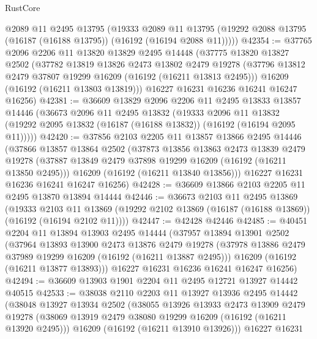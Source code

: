 \begin{lexlean}{RustCore}
\begin{coremodule}
      @2089
      @11
      @2495
      @13795
      (@19333
        @2089
        @11
        @13795
        (@19292 @2088 @13795 (@16187 (@16188 @13795)) (@16192 (@16194 @2088 @11)))))
@42354 := @37765
    @2096
    @2206
    @11
    @13820
    @13829
    @2495
    @14448
    (@37775
      @13820
      @13827
      @2502
      (@37782
        @13819
        @13826
        @2473
        @13802
        @2479
        @19278
        (@37796 @13812 @2479 @37807 @19299 @16209 (@16192 (@16211 @13813 @2495)))
        @16209
        (@16192 (@16211 @13803 @13819)))
      @16227
      @16231
      @16236
      @16241
      @16247
      @16256)
@42381 := @36609
    @13829
    @2096
    @2206
    @11
    @2495
    @13833
    @13857
    @14446
    (@36673
      @2096
      @11
      @2495
      @13832
      (@19333
        @2096
        @11
        @13832
        (@19292 @2095 @13832 (@16187 (@16188 @13832)) (@16192 (@16194 @2095 @11)))))
@42420 := @37856
    @2103
    @2205
    @11
    @13857
    @13866
    @2495
    @14446
    (@37866
      @13857
      @13864
      @2502
      (@37873
        @13856
        @13863
        @2473
        @13839
        @2479
        @19278
        (@37887 @13849 @2479 @37898 @19299 @16209 (@16192 (@16211 @13850 @2495)))
        @16209
        (@16192 (@16211 @13840 @13856)))
      @16227
      @16231
      @16236
      @16241
      @16247
      @16256)
@42428 := @36609 @13866 @2103 @2205 @11 @2495 @13870 @13894 @14444
@42446 := @36673
    @2103
    @11
    @2495
    @13869
    (@19333
      @2103
      @11
      @13869
      (@19292 @2102 @13869 (@16187 (@16188 @13869)) (@16192 (@16194 @2102 @11))))
@42447 := @42428 @42446
@42485 := @40451
    @2204
    @11
    @13894
    @13903
    @2495
    @14444
    (@37957
      @13894
      @13901
      @2502
      (@37964
        @13893
        @13900
        @2473
        @13876
        @2479
        @19278
        (@37978 @13886 @2479 @37989 @19299 @16209 (@16192 (@16211 @13887 @2495)))
        @16209
        (@16192 (@16211 @13877 @13893)))
      @16227
      @16231
      @16236
      @16241
      @16247
      @16256)
@42494 := @36609 @13903 @1901 @2204 @11 @2495 @12721 @13927 @14442 @40515
@42533 := @38038
    @2110
    @2203
    @11
    @13927
    @13936
    @2495
    @14442
    (@38048
      @13927
      @13934
      @2502
      (@38055
        @13926
        @13933
        @2473
        @13909
        @2479
        @19278
        (@38069 @13919 @2479 @38080 @19299 @16209 (@16192 (@16211 @13920 @2495)))
        @16209
        (@16192 (@16211 @13910 @13926)))
      @16227
      @16231

\end{coremodule}
\end{lexlean}
